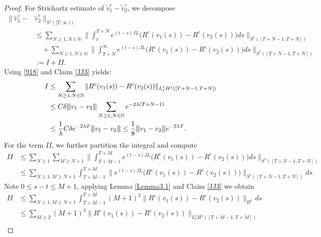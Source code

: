 \documentclass[10pt,a4paper]{amsart}
\newcommand{\vertiii}[1]{{\left\vert\kern-0.25ex\left\vert\kern-0.25ex\left\vert #1 
    \right\vert\kern-0.25ex\right\vert\kern-0.25ex\right\vert}}
\begin{document}
\begin{proof}
For Strichartz estimate of $\tilde v_1^c-\tilde v_2^c$, we decompose
\begin{align*}
	\|\tilde v_1^c-&\tilde v_2^c\|_{ S^1([T,\infty))}\\
	&\le \sum_{
		N\ge 1, N\in\mathbb N
		} \biggl\|\int_t^{T +N}e^{(t-s)JL} \bigl(R^c(v_1(s))-R^c(v_2(s))\bigr)ds\biggr\|_{ S^1([T+ N-1, T+ N])}  \\
	&\quad +\sum_{
		N\ge 1, N\in\mathbb N
		} \biggl\|\int_{T+N}^{\infty} e^{(t-s)JL}\bigl(R^c(v_1(s))-R^c(v_2(s))\bigr)ds\biggr\|_{S^1([T+N-1, T+ N])} \\
	&:= I + II.
\end{align*}
Using \eqref{918} and Claim \ref{JJ3} yields: 
\begin{align*}
	I &\le \sum_{
		N\ge 1, N\in\mathbb N} 
		\|R^c(v_1(s))-R^c(v_2(s))\|_{L_t^1 H^1([T+N-1, T+N])} \\
	&\le C\delta\vertiii{v_1-v_2} \sum_{
		N\ge 1, N\in\mathbb N		} 
		 e^{-2\lambda (T+N-1)}\\
	& \le \frac 1{\lambda} C \delta  e^{-2\lambda T}\vertiii{v_1-v_2}\le \frac 18 \vertiii{v_1-v_2}e^{-2\lambda T}.
\end{align*}
For the term $II$, we further partition the integral and compute 
\begin{align*}
	II &\le \sum_{
		N\ge 1	}\sum_{
			 M\ge N+1
		 }\biggl \|\int_{T+M-1}^{T+M} e^{(t-s)JL} 
	     \bigl (R^c(v_1(s))-R^c(v_2(s))\bigr)ds\biggr\|_{ S^1([T+N-1, T+N])} \\
	   &\le \sum_{
			   N\ge 1,
			   M\ge N+1
               }\int_{T+M-1}^{T+M}\bigl \|e^{(t-s)JL}  \bigl (R^c(v_1(s))-R^c(v_2(s))\bigr)\bigr\|_{ S^1([T+N-1, T+N])}ds. 
\end{align*}
Note $0 \le s-t \le M+1$, applying Lemma \ref{Lemma3.1} and Claim \ref{JJ3} we obtain
\begin{align*}               
	   II&\le \sum_{
	N\ge 1, M\ge N+1        
	      }\int_{T+M-1}^{T+M} (M+1)^2\bigl \|R^c(v_1(s))-R^c(v_2(s))\bigr\|_{ H^1} ds\\
	   &\le \sum_{
			   M\ge2
                         }(M+1)^3 \|R^c(v_1(s))-R^c(v_2(s))\|_{L_t^1 H^1([T+M-1, T+M])} \\

\end{align*}
\end{proof}
\end{document}
